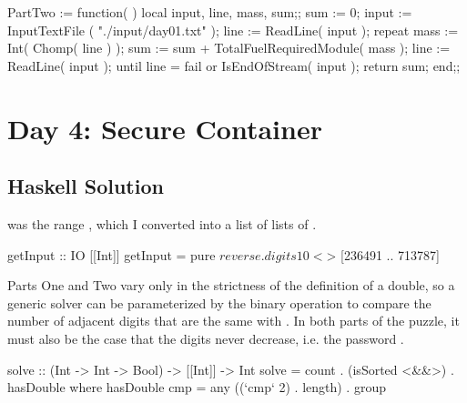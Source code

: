 \nwendcode{}\nwdocspar

\nwenddocs{}\plusendmoddef\nwstartdeflinemarkup{}\nwenddeflinemarkup
PartTwo := function( )
    local input, line, mass, sum;;
    sum := 0;
    input := InputTextFile ( "./input/day01.txt" );
    line := ReadLine( input );
    repeat
        mass := Int( Chomp( line ) );
        sum := sum + TotalFuelRequiredModule( mass );
        line := ReadLine( input );
    until line = fail or IsEndOfStream( input );
    return sum;
end;;
\nwendcode{}\nwdocspar
\nwenddocs{}\newpage
\section{Day 4: Secure Container}
\nwenddocs{}\subsection{Haskell Solution}

 was the range , which I converted into a
list of lists of .

\nwenddocs{}\endmoddef\nwstartdeflinemarkup{}\nwenddeflinemarkup
getInput :: IO [[Int]]
getInput = pure $ reverse . digits 10 <$> [236491 .. 713787]
\nwendcode{}\nwdocspar

 Parts One and Two vary only in the strictness of the definition of a double, so a generic solver can be parameterized by the binary operation to compare the number of adjacent digits that are the same with . In both parts of the puzzle, it must also be the case that the digits never decrease, i.e. the password .

\nwenddocs{}\endmoddef\nwstartdeflinemarkup{}\nwenddeflinemarkup
solve :: (Int -> Int -> Bool) -> [[Int]] -> Int
solve = count . (isSorted <&&>) . hasDouble
  where
    hasDouble cmp = any ((`cmp` 2) . length) . group
\nwendcode{}\nwdocspar


